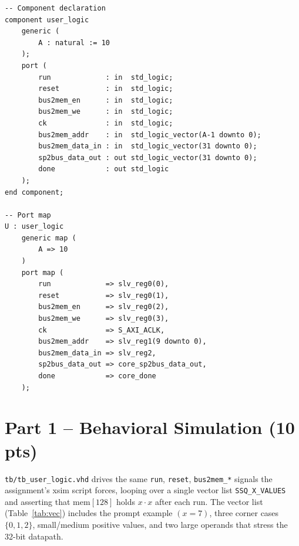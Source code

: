 \documentclass[11pt,letterpaper]{article}
\begin{document}
\begin{lstlisting}[style=vhdlstyle,caption={Component declaration and
port map of the \texttt{user\_logic} core inside
\texttt{sp101\_axi\_v1\_0\_S00\_AXI.vhd}.},label={lst:userlogic}]
-- Component declaration
component user_logic
    generic (
        A : natural := 10
    );
    port (
        run             : in  std_logic;
        reset           : in  std_logic;
        bus2mem_en      : in  std_logic;
        bus2mem_we      : in  std_logic;
        ck              : in  std_logic;
        bus2mem_addr    : in  std_logic_vector(A-1 downto 0);
        bus2mem_data_in : in  std_logic_vector(31 downto 0);
        sp2bus_data_out : out std_logic_vector(31 downto 0);
        done            : out std_logic
    );
end component;

-- Port map
U : user_logic
    generic map (
        A => 10
    )
    port map (
        run             => slv_reg0(0),
        reset           => slv_reg0(1),
        bus2mem_en      => slv_reg0(2),
        bus2mem_we      => slv_reg0(3),
        ck              => S_AXI_ACLK,
        bus2mem_addr    => slv_reg1(9 downto 0),
        bus2mem_data_in => slv_reg2,
        sp2bus_data_out => core_sp2bus_data_out,
        done            => core_done
    );
\end{lstlisting}

\section{Part 1 -- Behavioral Simulation (10 pts)}

\texttt{tb/tb\_user\_logic.vhd} drives the same \texttt{run},
\texttt{reset}, \texttt{bus2mem\_*} signals the assignment's xsim
script forces, looping over a single vector list
\texttt{SSQ\_X\_VALUES} and asserting that \(\mathrm{mem}[128]\)
holds \(x\cdot x\) after each run.  The vector list (Table~\ref{tab:vec})
includes the prompt example \((x=7)\), three corner cases \(\{0,1,2\}\),
small/medium positive values, and two large operands that stress the
32-bit datapath.
\end{document}
